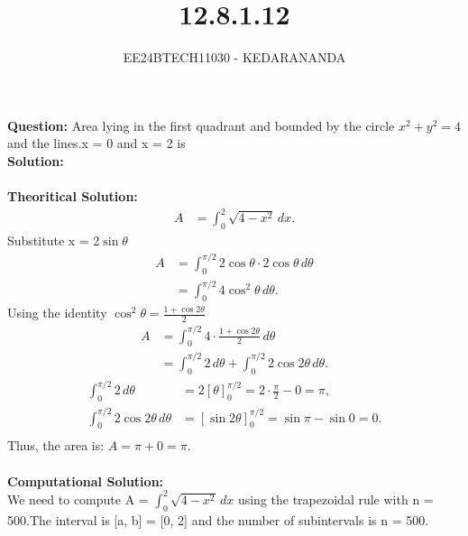 \documentclass[journal]{IEEEtran}
\begin{document}

\vspace{3cm}

\title{12.8.1.12}
\author{EE24BTECH11030 - KEDARANANDA}
{\let\newpage\relax\maketitle}

\renewcommand{\thefigure}{\theenumi}
\renewcommand{\thetable}{\theenumi}
\setlength{\intextsep}{10pt} %

\textbf{Question:}
 Area lying in the first quadrant and bounded by the circle $x^{2} + y^{2} = 4$ and the lines.x = 0 and x = 2 is\\

\textbf{Solution:}\\\\
\textbf{Theoritical Solution:}
\begin{align}
 A &= \int_0^2 \sqrt{4 - x^2} \, dx. 
\end{align}
Substitute x = 2$\sin \theta$\\
\begin{align}
A &= \int_0^{\pi/2} 2 \cos \theta \cdot 2 \cos \theta \, d\theta \\
&= \int_0^{\pi/2} 4 \cos^2 \theta \, d\theta. 
\end{align}
Using the identity  $\cos^2 \theta = \frac{1 + \cos 2\theta}{2}$\\
\begin{align}
A &= \int_0^{\pi/2} 4 \cdot \frac{1 + \cos 2\theta}{2} \, d\theta \\
&= \int_0^{\pi/2} 2 \, d\theta + \int_0^{\pi/2} 2 \cos 2\theta \, d\theta. 
\end{align}
\begin{align}
\int_0^{\pi/2} 2 \, d\theta &= 2 \left[ \theta \right]_0^{\pi/2} = 2 \cdot \frac{\pi}{2} - 0 = \pi, \\
\int_0^{\pi/2} 2 \cos 2\theta \, d\theta &= \left[ \sin 2\theta \right]_0^{\pi/2} = \sin \pi - \sin 0 = 0. \\
\end{align}
Thus, the area is: $A = \pi + 0 = \pi$.\\\\
\textbf{Computational Solution:}\\
We need to compute  A = $\int_0^2 \sqrt{4 - x^2} \, dx$ using the trapezoidal rule with n = 500.The interval is  [a, b] = [0, 2]  and the number of subintervals is  n = 500.
\end{document}
